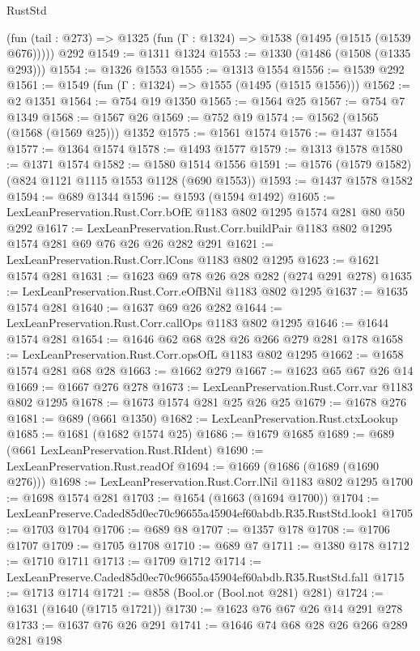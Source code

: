 \begin{lexlean}{RustStd}
\begin{coremodule}
    (fun (tail : @273) => @1325 (fun (Γ : @1324) => @1538 (@1495 (@1515 (@1539 @676)))))
    @292
@1549 := @1311 @1324
@1553 := @1330 (@1486 (@1508 (@1335 @293)))
@1554 := @1326 @1553
@1555 := @1313 @1554
@1556 := @1539 @292
@1561 := @1549 (fun (Γ : @1324) => @1555 (@1495 (@1515 @1556)))
@1562 := @2 @1351
@1564 := @754 @19 @1350
@1565 := @1564 @25
@1567 := @754 @7 @1349
@1568 := @1567 @26
@1569 := @752 @19
@1574 := @1562 (@1565 (@1568 (@1569 @25))) @1352
@1575 := @1561 @1574
@1576 := @1437 @1554
@1577 := @1364 @1574
@1578 := @1493 @1577
@1579 := @1313 @1578
@1580 := @1371 @1574
@1582 := @1580 @1514 @1556
@1591 := @1576 (@1579 @1582) (@824 @1121 @1115 @1553 @1128 (@690 @1553))
@1593 := @1437 @1578 @1582
@1594 := @689 @1344
@1596 := @1593 (@1594 @1492)
@1605 := LexLeanPreservation.Rust.Corr.bOfE @1183 @802 @1295 @1574 @281 @80 @50 @292
@1617 := LexLeanPreservation.Rust.Corr.buildPair
    @1183
    @802
    @1295
    @1574
    @281
    @69
    @76
    @26
    @26
    @282
    @291
@1621 := LexLeanPreservation.Rust.Corr.lCons @1183 @802 @1295
@1623 := @1621 @1574 @281
@1631 := @1623 @69 @78 @26 @28 @282 (@274 @291 @278)
@1635 := LexLeanPreservation.Rust.Corr.eOfBNil @1183 @802 @1295
@1637 := @1635 @1574 @281
@1640 := @1637 @69 @26 @282
@1644 := LexLeanPreservation.Rust.Corr.callOps @1183 @802 @1295
@1646 := @1644 @1574 @281
@1654 := @1646 @62 @68 @28 @26 @266 @279 @281 @178
@1658 := LexLeanPreservation.Rust.Corr.opsOfL @1183 @802 @1295
@1662 := @1658 @1574 @281 @68 @28
@1663 := @1662 @279
@1667 := @1623 @65 @67 @26 @14
@1669 := @1667 @276 @278
@1673 := LexLeanPreservation.Rust.Corr.var @1183 @802 @1295
@1678 := @1673 @1574 @281 @25 @26 @25
@1679 := @1678 @276
@1681 := @689 (@661 @1350)
@1682 := LexLeanPreservation.Rust.ctxLookup
@1685 := @1681 (@1682 @1574 @25)
@1686 := @1679 @1685
@1689 := @689 (@661 LexLeanPreservation.Rust.RIdent)
@1690 := LexLeanPreservation.Rust.readOf
@1694 := @1669 (@1686 (@1689 (@1690 @276)))
@1698 := LexLeanPreservation.Rust.Corr.lNil @1183 @802 @1295
@1700 := @1698 @1574 @281
@1703 := @1654 (@1663 (@1694 @1700))
@1704 := LexLeanPreserve.Caded85d0ec70c96655a45904ef60abdb.R35.RustStd.look1
@1705 := @1703 @1704
@1706 := @689 @8
@1707 := @1357 @178
@1708 := @1706 @1707
@1709 := @1705 @1708
@1710 := @689 @7
@1711 := @1380 @178
@1712 := @1710 @1711
@1713 := @1709 @1712
@1714 := LexLeanPreserve.Caded85d0ec70c96655a45904ef60abdb.R35.RustStd.fal1
@1715 := @1713 @1714
@1721 := @858 (Bool.or (Bool.not @281) @281)
@1724 := @1631 (@1640 (@1715 @1721))
@1730 := @1623 @76 @67 @26 @14 @291 @278
@1733 := @1637 @76 @26 @291
@1741 := @1646 @74 @68 @28 @26 @266 @289 @281 @198

\end{coremodule}
\end{lexlean}
